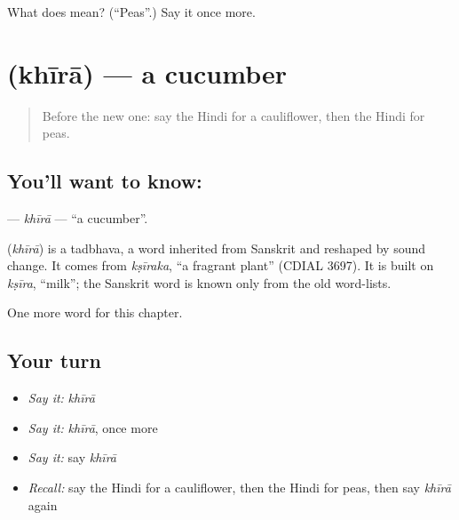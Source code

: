 \begin{tcolorbox}[breakable,colback=teal!4,colframe=teal!35!black,title={Before you move on}]
What does  mean? (\textquotedblleft{}Peas\textquotedblright{}.) Say it once more.
\end{tcolorbox}
\section[\texorpdfstring{\hi{खीरा} (khīrā)}{खीरा (khīrā)}]{ (khīrā) — a cucumber}

\label{lesson:HI-C139-khira}



\begin{quote}
Before the new one: say the Hindi for a cauliflower, then the Hindi for peas.
\end{quote}

\subsection*{You'll want to know: }
\textbf{} — \emph{khīrā} — \textquotedblleft{}a cucumber\textquotedblright{}.

\begin{cousinweb}
\textbf{} (\emph{khīrā}) is a tadbhava, a word inherited from Sanskrit and reshaped by sound change. It comes from \emph{kṣīraka}, \textquotedblleft{}a fragrant plant\textquotedblright{} (CDIAL 3697). It is built on \emph{kṣīra}, \textquotedblleft{}milk\textquotedblright{}; the Sanskrit word is known only from the old word-lists.
\end{cousinweb}

\begin{grammarlens}[title={What you've built}]
One more word for this chapter.
\end{grammarlens}

\subsection*{Your turn}
\begin{itemize}
\raggedright
  \item \emph{Say it:} \emph{khīrā}
  \item \emph{Say it:} \emph{khīrā}, once more
  \item \emph{Say it:} say \emph{khīrā}
  \item \emph{Recall:} say the Hindi for a cauliflower, then the Hindi for peas, then say \emph{khīrā} again
\end{itemize}

